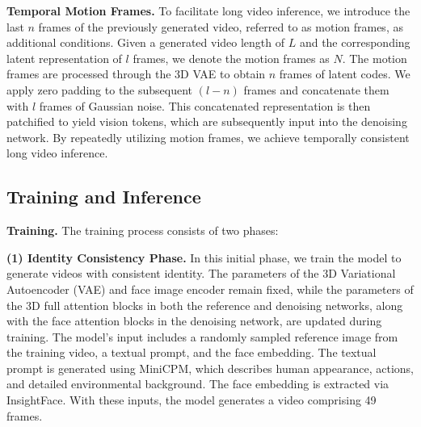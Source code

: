 \noindent\textbf{Temporal Motion Frames.}  
To facilitate long video inference, we introduce the last \(n\) frames of the previously generated video, referred to as motion frames, as additional conditions. Given a generated video length of \(L\) and the corresponding latent representation of \(l\) frames, we denote the motion frames as \(N\). 
The motion frames are processed through the 3D VAE to obtain \(n\) frames of latent codes. 
We apply zero padding to the subsequent \((l-n)\) frames and concatenate them with \(l\) frames of Gaussian noise. 
This concatenated representation is then patchified to yield vision tokens, which are subsequently input into the denoising network. By repeatedly utilizing motion frames, we achieve temporally consistent long video inference.



\subsection{Training and Inference}\label{sec:train}

\noindent\textbf{Training.}  
The training process consists of two phases:

\textbf{(1) Identity Consistency Phase.} In this initial phase, we train the model to generate videos with consistent identity. The parameters of the 3D Variational Autoencoder (VAE) and face image encoder remain fixed, while the parameters of the 3D full attention blocks in both the reference and denoising networks, along with the face attention blocks in the denoising network, are updated during training. The model’s input includes a randomly sampled reference image from the training video, a textual prompt, and the face embedding. The textual prompt is generated using MiniCPM\cite{yao2024minicpm}, which describes human appearance, actions, and detailed environmental background. The face embedding is extracted via InsightFace\cite{insightface2024}. With these inputs, the model generates a video comprising 49 frames.

